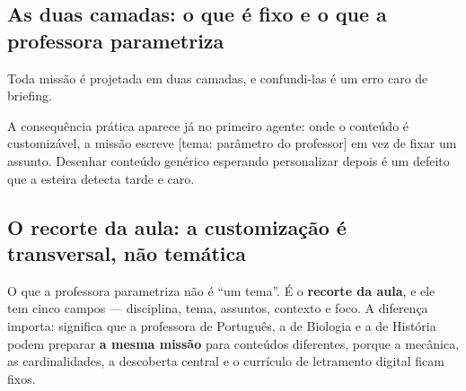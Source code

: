 \documentclass[11pt,a4paper]{article}
\newcommand{\cod}[1]{{\ttfamily\small #1}}
\begin{document}
\subsection{As duas camadas: o que é fixo e o que a professora parametriza}

Toda missão é projetada em duas camadas, e confundi-las é um erro caro de briefing.

\begin{center}
\end{center}

A consequência prática aparece já no primeiro agente: onde o conteúdo é customizável, a missão escreve \cod{[tema: parâmetro do professor]} em vez de fixar um assunto. Desenhar conteúdo genérico esperando personalizar depois é um defeito que a esteira detecta tarde e caro.

\subsection{O recorte da aula: a customização é transversal, não temática}
\label{sec:recorte}

O que a professora parametriza não é ``um tema''. É o \textbf{recorte da aula}, e ele tem cinco campos --- disciplina, tema, assuntos, contexto e foco. A diferença importa: significa que a professora de Português, a de Biologia e a de História podem preparar \textbf{a mesma missão} para conteúdos diferentes, porque a mecânica, as cardinalidades, a descoberta central e o currículo de letramento digital ficam fixos.
\end{document}

